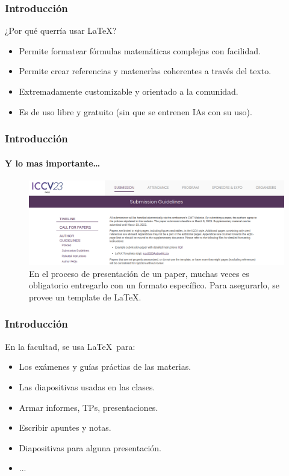 \begin{frame}
    \frametitle{Introducción}
    \begin{tcolorbox}[colframe=color1]
        \begin{center}
            ¿Por qué querría usar \LaTeX ?
        \end{center}
    \end{tcolorbox}

    \begin{itemize}
        \item Permite formatear fórmulas matemáticas complejas con facilidad.
        \item Permite crear referencias y matenerlas coherentes a través del texto.
        \item Extremadamente customizable y orientado a la comunidad.
        \item Es de uso libre y gratuito (sin que se entrenen IAs con su uso).
    \end{itemize}
\end{frame}

\begin{frame}
    \frametitle{Introducción}
    \framesubtitle{Y lo mas importante\dots}
    \begin{figure}[h]
        \centering
        \includegraphics[width=\textwidth]{../images/submission.png}
        \caption{En el proceso de presentación de un paper, muchas veces es obligatorio entregarlo con un formato específico. Para asegurarlo, se provee un template de \LaTeX.}
    \end{figure}
\end{frame}

\begin{frame}
\frametitle{Introducción}
    En la facultad, se usa \LaTeX\ para:
    \begin{itemize}
    \item Los exámenes y guías práctias de las materias.
    \item Las diapositivas usadas en las clases.
    \item Armar informes, TPs, presentaciones.
    \item Escribir apuntes y notas.
    \item Diapositivas para alguna presentación.
    \item ...
    \end{itemize}
\end{frame}
